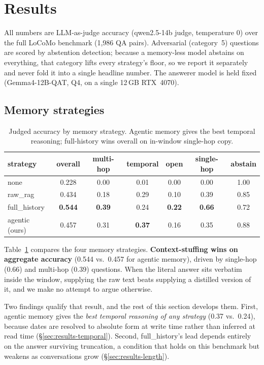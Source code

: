 \section{Results}
\label{sec:results}

All numbers are LLM-as-judge accuracy (qwen2.5-14b judge, temperature 0) over the
full LoCoMo benchmark (1{,}986 QA pairs). Adversarial (category~5) questions are
scored by abstention detection; because a memory-less model abstains on
everything, that category lifts every strategy's floor, so we report it
separately and never fold it into a single headline number. The answerer model is
held fixed (Gemma4-12B-QAT, Q4, on a single 12\,GB RTX~4070).

\subsection{Memory strategies}
\label{sec:results-strategies}

\begin{table}[t]
\centering\small
\begin{tabular}{lcccccc}
\toprule
strategy & overall & multi-hop & temporal & open & single-hop & abstain \\
\midrule
none & 0.228 & 0.00 & 0.01 & 0.00 & 0.00 & 1.00 \\
raw\_rag & 0.434 & 0.18 & 0.29 & 0.10 & 0.39 & 0.85 \\
full\_history & \textbf{0.544} & \textbf{0.39} & 0.24 & \textbf{0.22} & \textbf{0.66} & 0.72 \\
agentic (ours) & 0.457 & 0.31 & \textbf{0.37} & 0.16 & 0.35 & 0.88 \\
\bottomrule
\end{tabular}
\caption{Judged accuracy by memory strategy. Agentic memory gives the best
temporal reasoning; full-history wins overall on in-window single-hop copy.}
\label{tab:strategies}
\end{table}

Table~\ref{tab:strategies} compares the four memory strategies.
\textbf{Context-stuffing wins on aggregate accuracy} (0.544 vs.\ 0.457 for
agentic memory), driven by single-hop (0.66) and multi-hop (0.39) questions.
When the literal answer sits verbatim inside the window, supplying the raw text
beats supplying a distilled version of it, and we make no attempt to argue
otherwise.

Two findings qualify that result, and the rest of this section develops them.
First, agentic memory gives the \emph{best temporal reasoning of any strategy}
(0.37 vs.\ 0.24), because dates are resolved to absolute form at write time
rather than inferred at read time (\S\ref{sec:results-temporal}). Second,
full\_history's lead depends entirely on the answer surviving truncation, a
condition that holds on this benchmark but weakens as conversations grow
(\S\ref{sec:results-length}).

